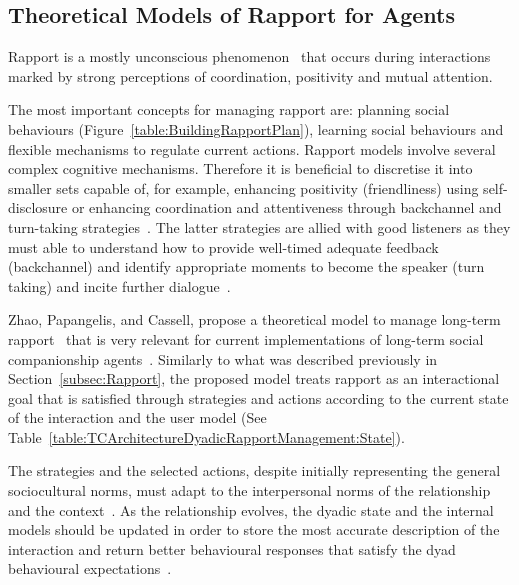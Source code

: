 \subsection{Theoretical Models of Rapport for Agents}
\label{sub:sec:ComputationalModelsOfRapport}

Rapport is a mostly unconscious phenomenon~\cite{Zwiers2011} that occurs during interactions marked by strong perceptions of coordination, positivity and mutual attention.

The most important concepts for managing rapport are: planning social behaviours (Figure~\ref{table:BuildingRapportPlan}), learning social behaviours and flexible mechanisms to regulate current actions. Rapport models involve several complex cognitive mechanisms. Therefore it is beneficial to discretise it into smaller sets capable of, for example, enhancing positivity (friendliness) using self-disclosure or enhancing coordination and attentiveness through backchannel and turn-taking strategies~\cite{Sacks1974, Kahn2008, Welbergen2012}. The latter strategies are allied with good listeners as they must able to understand how to provide well-timed adequate feedback (backchannel) and identify appropriate moments to become the speaker (turn taking) and incite further dialogue~\cite{Sacks1974, Poppe2010}.

Zhao, Papangelis, and Cassell, propose a theoretical model to manage long-term rapport~\cite{Zhao2014, Papangelis2014} that is very relevant for current implementations of long-term social companionship agents~\cite{Lisetti2013, Bickmore2005, Kang2005}. Similarly to what was described previously in Section~\ref{subsec:Rapport}, the proposed model treats rapport as an interactional goal that is satisfied through strategies and actions according to the current state of the interaction and the user model (See Table~\ref{table:TCArchitectureDyadicRapportManagement:State}).

The strategies and the selected actions, despite initially representing the general sociocultural norms, must adapt to the interpersonal norms of the relationship and the context~\cite{Zhao2014}. As the relationship evolves, the dyadic state and the internal models should be updated in order to store the most accurate description of the interaction and return better behavioural responses that satisfy the dyad behavioural expectations~\cite{Papangelis2014}.

